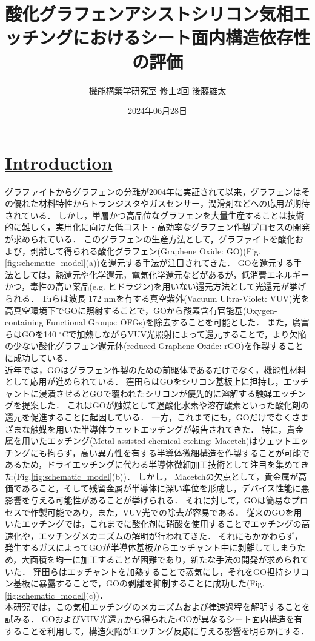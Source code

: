 \documentclass[platex,dvipdfmx]{jlreq}			%
\title{酸化グラフェンアシストシリコン気相エッチングにおけるシート面内構造依存性の評価}
\author{機能構築学研究室 修士2回 後藤雄太}
\date{2024年06月28日}
\begin{document}
\maketitle

\section*{\ul{Introduction}}
グラファイトからグラフェンの分離が2004年に実証されて以来，グラフェンはその優れた材料特性からトランジスタやガスセンサー，潤滑剤などへの応用が期待されている．
しかし，単層かつ高品位なグラフェンを大量生産することは技術的に難しく，実用化に向けた低コスト・高効率なグラフェン作製プロセスの開発が求められている．
このグラフェンの生産方法として，グラファイトを酸化および，剥離して得られる酸化グラフェン(Graphene Oxide: GO)(Fig.\ref{fig:schematic_model}(a))を還元する手法が注目されてきた．
GOを還元する手法としては，熱還元や化学還元，電気化学還元などがあるが，低消費エネルギーかつ，毒性の高い薬品(e.g. ヒドラジン)を用いない還元方法として光還元が挙げられる．
Tuらは波長 172 nmを有する真空紫外(Vacuum Ultra-Violet: VUV)光を高真空環境下でGOに照射することで，GOから酸素含有官能基(Oxygen-containing Functional Groups: OFGs)を除去することを可能とした．
また，廣富らはGOを140 ${}^\circ$Cで加熱しながらVUV光照射によって還元することで，より欠陥の少ない酸化グラフェン還元体(reduced Graphene Oxide: rGO)を作製することに成功している．\\
\indent
近年では，GOはグラフェン作製のための前駆体であるだけでなく，機能性材料として応用が進められている．
窪田らはGOをシリコン基板上に担持し，エッチャントに浸漬させるとGOで覆われたシリコンが優先的に溶解する触媒エッチングを提案した．
これはGOが触媒として過酸化水素や溶存酸素といった酸化剤の還元を促進することに起因している．
一方，これまでにも，GOだけでなくさまざまな触媒を用いた半導体ウェットエッチングが報告されてきた．
特に，貴金属を用いたエッチング(Metal-assisted chemical etching: Macetch)はウェットエッチングにも拘らず，高い異方性を有する半導体微細構造を作製することが可能であるため，ドライエッチングに代わる半導体微細加工技術として注目を集めてきた(Fig.\ref{fig:schematic_model}(b))．
しかし， Macetchの欠点として，貴金属が高価であること，そして残留金属が半導体に深い準位を形成し，デバイス性能に悪影響を与える可能性があることが挙げられる．
それに対して，GOは簡易なプロセスで作製可能であり，また，VUV光での除去が容易である．
従来のGOを用いたエッチングでは，これまでに酸化剤に硝酸を使用することでエッチングの高速化や，エッチングメカニズムの解明が行われてきた．
それにもかかわらず，発生するガスによってGOが半導体基板からエッチャント中に剥離してしまうため，大面積を均一に加工することが困難であり，新たな手法の開発が求められていた．
窪田らはエッチャントを加熱することで蒸気にし，それをGO担持シリコン基板に暴露することで，GOの剥離を抑制することに成功した(Fig.\ref{fig:schematic_model}(c))．\\
\indent
本研究では，この気相エッチングのメカニズムおよび律速過程を解明することを試みる．
GOおよびVUV光還元から得られたrGOが異なるシート面内構造を有することを利用して，構造欠陥がエッチング反応に与える影響を明らかにする．
\end{document}
